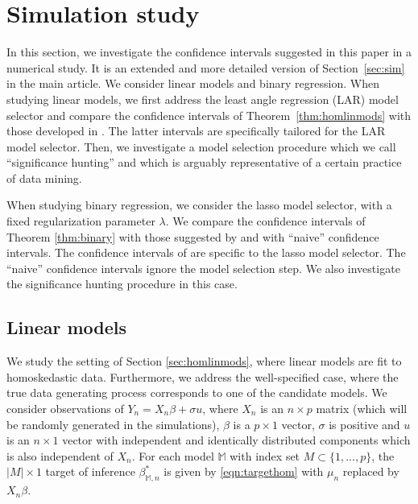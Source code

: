 \documentclass[preprint]{imsart}
\numberwithin{equation}{section}
\begin{document}
\appendix

\section{Simulation study}\label{app:sim}

In this section, we investigate the confidence intervals suggested in this paper in a numerical study. It is an extended and more detailed version of Section~\ref{sec:sim} in the main article. We consider linear models and binary regression. When studying linear models, we first address the least angle regression (LAR) model selector \cite{efron04least} and compare the confidence intervals of Theorem~\ref{thm:homlinmods} with those developed in \cite{Tib15a}. The latter intervals are specifically tailored for the LAR model selector.
Then, we investigate a model selection procedure which we call ``significance hunting'' and which is arguably representative of a certain practice of data mining.

When studying binary regression, we consider the lasso model selector, with a fixed regularization parameter $\lambda$. We compare the confidence intervals of Theorem \ref{thm:binary} with those suggested by \cite{taylor17post} and with ``naive'' confidence intervals.  
The confidence intervals of \cite{taylor17post} are specific to the lasso model selector. The ``naive'' confidence intervals ignore the model selection step. We also investigate the significance hunting procedure in this case.





\subsection{Linear models}

We study the setting of Section \ref{sec:homlinmods}, where linear models are fit to homoskedastic data. Furthermore, we address the well-specified case, where the true data generating process corresponds to one of the candidate models.
We consider observations of $Y_n = X_n \beta + \sigma u $, where $X_n$ is an $n \times p$ matrix (which will be randomly generated in the simulations), $\beta$ is a $p \times 1$ vector, $\sigma$ is positive and $u$ is an $n \times 1$ vector with independent and identically distributed components which is also independent of $X_n$. 
For each model $\mathbb{M}$ with index set $M \subset \{1,...,p\}$, the $|M| \times 1$ target of inference $\beta_{\mathbb{M},n}^*$ is given by \eqref{eqn:targethom} with $ \mu_n$ replaced by $X_n \beta$. 
\end{document}
